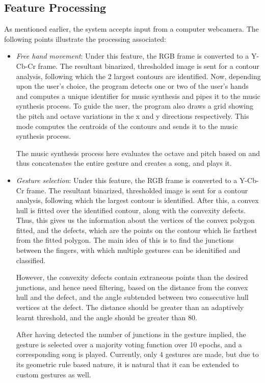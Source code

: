 \documentclass[letterpaper, 10 pt, twoside, conference]{ieeeconf}
\begin{document}
\subsection{Feature Processing}
  As mentioned earlier, the system accepts input from a computer webcamera. The following points illustrate
  the processing associated:
  \begin{itemize}
    \item \textit{Free hand movement}: Under this feature, the RGB frame is converted to a Y-Cb-Cr frame. The
      resultant binarized, thresholded image is sent for a contour analysis, following which the 2 largest
      contours are identified. Now, depending upon the user's choice, the program detects one or two of the user's
      hands and computes a unique identifier for music synthesis and pipes it to the music synthesis process. To guide
      the user, the program also draws a grid showing the pitch and octave variations in the x and y directions
      respectively. This mode computes the centroids of the contours and sends it to the music synthesis process.

      The music synthesis process here evaluates the octave and pitch based on %
      and thus concatenates the entire gesture and creates a song, and plays it.
      \par\null\par
    \item \textit{Gesture selection}: Under this feature, the RGB frame is converted to a Y-Cb-Cr frame. The
      resultant binarized, thresholded image is sent for a contour analysis, following which the largest contour
      is identified. After this, a convex hull is fitted over the identified contour, along with the convexity defects.
      Thus, this gives us the information about the vertices of the convex polygon fitted, and the defects,
      which are the points on the contour which lie farthest from the fitted polygon. The main idea of this is
      to find the junctions between the fingers, with which multiple gestures can be idenitified and classified.
      
      However, the convexity defects contain extraneous points than the desired junctions, and hence need filtering,
      based on the distance from the convex hull and the defect, and the angle subtended between two consecutive
      hull vertices at the defect. The distance should be greater than an adaptively learnt threshold, and the angle
      should be greater than 80\degree.

      After having detected the number of junctions in the gesture implied, the gesture is selected over a majority
      voting function over 10 epochs, and a corresponding
      song is played. Currently, only 4 gestures are made, but due to its geometric rule based nature, it is natural that
      it can be extended to custom gestures as well.

  \end{itemize}
\end{document}
